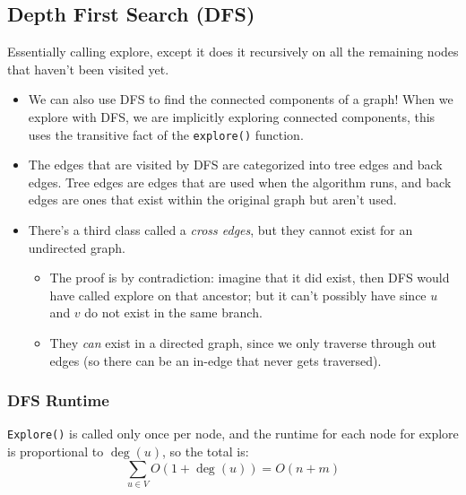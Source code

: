 \documentclass[10pt]{article}
\begin{document}
	\subsection{Depth First Search (DFS)}
	Essentially calling explore, except it does it recursively on all the remaining nodes that haven't 
	been visited yet.
	\begin{itemize}
		\item We can also use DFS to find the connected components of a graph! When we explore with DFS, we are 
			implicitly exploring connected components, this uses the transitive fact of the \texttt{explore()}
			function.
		\item The edges that are visited by DFS are categorized into tree edges and back edges. Tree 
			edges are edges that are used when the algorithm runs, and back edges are ones that exist within 
			the original graph but aren't used. 
		\item There's a third class called a \textit{cross edges}, but they cannot exist for an undirected graph.
			\begin{itemize}
				\item The proof is by contradiction: imagine that it did exist, then DFS would have called
					explore on that ancestor; but it can't possibly have since $u$ and $v$ do not 
					exist in the same branch.
				\item They \textit{can} exist in a directed graph, since we only traverse through out 
					edges (so there can be an in-edge that never gets traversed).
			\end{itemize}
	\end{itemize}	

	\subsubsection{DFS Runtime}
	\texttt{Explore()} is called only once per node, and the runtime for each node for explore is 
	proportional to $\deg(u)$, so the total is:
	\[
		\sum_{u \in V} O(1 + \deg(u)) = O(n + m)
	\] 
\end{document}
